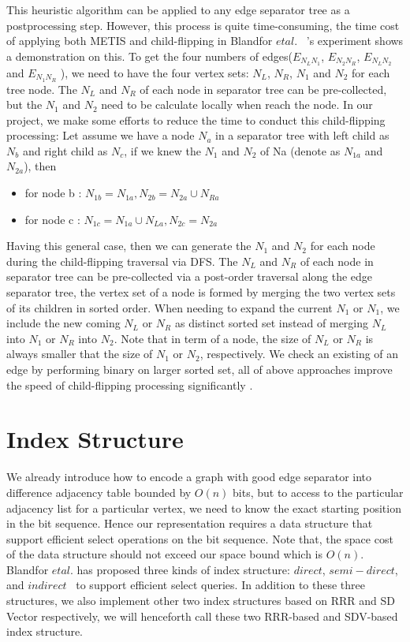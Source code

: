 \documentclass[12pt,glossary]{dalthesis}
\begin{document}
This heuristic algorithm can be applied to any edge separator tree as a postprocessing
step. However, this process is quite time-consuming, the time cost of applying both METIS and child-flipping in Blandfor $et al.$ ~\cite{compact-representation}'s experiment shows a demonstration on this. To get the four numbers of edges($E_{N_{L}N_{1}}$, $E_{N_{2}N_{R}}$, $E_{N_{L}N_{2}}$ and $E_{N_{1}N_{R}}$ ), we need to have the four vertex sets: $N_{L}$, $N_{R}$, $N_{1}$ and $N_{2}$ for each tree node. The $N_{L}$ and $N_{R}$ of each node in separator tree can be pre-collected, but the $N_{1}$ and $N_{2}$ need to be calculate locally when reach the node. In our project, we make some efforts to reduce the time to conduct this child-flipping processing: Let assume we have a node $N_{a}$ in a separator tree with left child as $N_{b}$ and right child as $N_{c}$, if we knew the $N_{1}$ and $N_{2}$ of Na (denote as $N_{1a}$ and $N_{2a}$), then

\begin{itemize}[noitemsep]
\item for node b : $ N_{1b} = N_{1a}, N_{2b} = N_{2a} \cup N_{Ra}$
\item for node c : $ N_{1c} = N_{1a} \cup N_{La}, N_{2c} = N_{2a}$ 
\end{itemize}

Having this general case, then we can generate the $N_{1}$ and $N_{2}$ for each node during the child-flipping traversal via DFS. The $N_{L}$ and $N_{R}$ of each node in separator tree can be pre-collected via a post-order traversal along the edge separator tree, the vertex set of a node is formed by merging the two vertex sets of its children in sorted order. When needing to expand the current $N_{1}$ or $N_{1}$, we include the new coming $N_{L}$ or $N_{R}$ as distinct sorted set instead of merging $N_{L}$ into $N_{1}$ or $N_{R}$ into $N_{2}$. Note that in term of a node, the size of $N_{L}$ or $N_{R}$ is always smaller that the size of $N_{1}$ or $N_{2}$, respectively. We check an existing of an edge by performing binary on larger sorted set, all of above approaches improve the speed of child-flipping processing significantly .

\chapter{Index Structure}

We already introduce how to encode a graph with good edge separator into difference adjacency table bounded by $O(n)$ bits, but to access to the particular adjacency list for a particular vertex, we need to know the exact starting position in the bit sequence. Hence our representation requires a data structure that support efficient select operations on the bit sequence. Note that, the space cost of the data structure should not exceed our space bound which is $O(n)$. Blandfor $et al.$ has proposed three kinds of index structure: $direct$, $semi-direct$, and $indirect$~\cite{compact-representation} to support efficient select queries. In addition to these three structures, we also implement other two index structures based on RRR and SD Vector respectively, we will henceforth call these two RRR-based and SDV-based index structure. 
\end{document}
